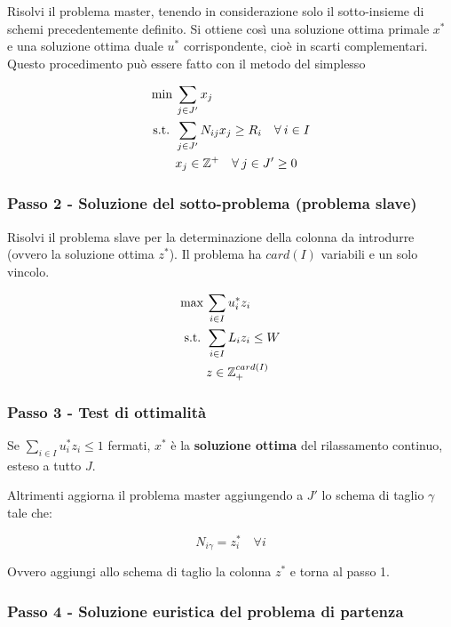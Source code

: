 Risolvi il problema master, tenendo in considerazione solo il sotto-insieme di schemi precedentemente definito.
Si ottiene così una soluzione ottima primale $x^*$ e una soluzione ottima duale $u^*$ corrispondente, cioè in scarti complementari.
Questo procedimento può essere fatto con il metodo del simplesso

\begin{align*}
\min\:& \sum\limits_{j \in J'} x_j  \\
\text{s.t. }  & \sum\limits_{j \in J'} N_{ij}x_j \geq R_i  \quad \forall\: i \in I\\
& x_j \in \mathbb{Z}^+ \quad \forall \: j \in J' \geq 0
\end{align*}

\subsubsection{Passo 2 - Soluzione del sotto-problema (problema slave)}

Risolvi il problema slave per la determinazione della colonna da introdurre (ovvero la soluzione ottima $z^*$).
Il problema ha $card(I)$ variabili e un solo vincolo.

\begin{align*}
\max \:& \sum\limits_{i \in I} u_{i}^* z_i \\
\text{s.t. }    & \sum\limits_{i \in I} L_i z_i \leq W \\
&z \in \mathbb{Z}_{+}^{card(I)}
\end{align*}

\subsubsection{Passo 3 - Test di ottimalità}

Se $\sum\limits_{i \in I} u_{i}^* z_i \leq 1$ fermati, $x^*$ è la \textbf{soluzione ottima} del rilassamento continuo, esteso a tutto $J$.

Altrimenti aggiorna il problema master aggiungendo a $J'$ lo schema di taglio $\gamma$ tale che:

$$
N_{i\gamma} = z_{i}^* \quad \forall i
$$

Ovvero aggiungi allo schema di taglio la colonna $z^*$ e torna al passo 1.

\subsubsection{Passo 4 - Soluzione euristica del problema di partenza}

